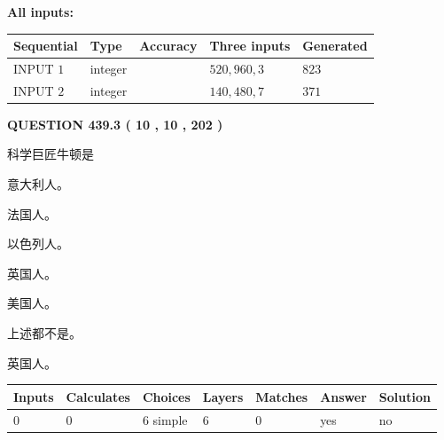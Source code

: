 \documentclass{ctexart}
\begin{document}
   
   
   
\noindent\vspace{0.1in}\hspace{-0.08in} {\textbf{\Large{All inputs: }}}
   
   
  
  
\noindent\begin{tabular}{|l|l|l|l|l|}
\hline
 Sequential & Type & Accuracy & Three inputs & Generated \\ 
\hline
 
 
  INPUT $  1 $ & integer &  & $
 520
 , 
 960
 , 
 3
 $ & $ 823 $ 
 \\  \hline  
 
 
  INPUT $  2 $ & integer &  & $
 140
 , 
 480
 , 
 7
 $ & $ 371 $ 
 \\  \hline  
 \end{tabular}
   
   
  
\vspace{0.2in}
  
{\textbf{\Large{QUESTION
439.3 
 ( 10 , 10 , 202 )
}}}
  
  
科学巨匠牛顿是
 
 
意大利人。
 
 
法国人。
 
 
以色列人。
 
 
英国人。
 
 
美国人。
 
 
 上述都不是。
 
 
\noindent{}
 
 
英国人。
 
 
\noindent{}
 
 
   
   
   
   
\noindent\begin{tabular}{|l|l|l|l|l|l|l|}
 \hline
Inputs & Calculates & Choices & Layers & Matches & Answer & Solution \\ \hline
 0  & 
 0  & 
 6
  simple  
  & 
 6  & 
 0  & 
  yes & 
  no 
  \\ \hline
 \end{tabular}
   
\end{document}
